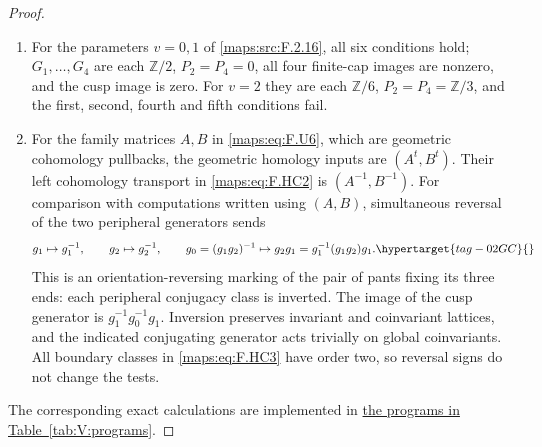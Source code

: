\documentclass[11pt,a4paper]{article}
\numberwithin{equation}{section}
\theoremstyle{definition}
\begin{document}
\begin{proof}
\begin{enumerate}[label=\arabic*.]
\item For the parameters $v=0,1$ of \ref{maps:src:F.2.16}, all six
conditions hold;
$G_1,\ldots,G_4$ are each $\mathbb Z/2$,
$P_2=P_4=0$, all four finite-cap images are nonzero,
and the cusp image is zero.
For $v=2$ they are each $\mathbb Z/6$,
$P_2=P_4=\mathbb Z/3$, and the first, second,
fourth and fifth conditions fail.

\item For the family matrices $A,B$ in \eqref{maps:eq:F.U6}, which
are geometric cohomology pullbacks, the geometric homology inputs
are $(A^t,B^t)$. Their left cohomology transport in
\eqref{maps:eq:F.HC2} is $(A^{-1},B^{-1})$.
For comparison with computations written using
$(A,B)$, simultaneous reversal of the two peripheral
generators sends
\begin{equation}
 g_1\mapsto g_1^{-1},\qquad
 g_2\mapsto g_2^{-1},\qquad
 g_0=(g_1g_2)^{-1}\mapsto
     g_2g_1=g_1^{-1}(g_1g_2)g_1 .
 \hypertarget{tag-02GC}{}\label{maps:eq:F.HC12}
\end{equation}
This is an orientation-reversing marking of the
pair of pants fixing its three ends: each peripheral
conjugacy class is inverted.
The image of the cusp generator is $g_1^{-1}g_0^{-1}g_1$.
Inversion preserves invariant and coinvariant
lattices, and the indicated conjugating generator
acts trivially on global coinvariants.
All boundary classes in \eqref{maps:eq:F.HC3} have order two, so
reversal signs do not change the tests.

\end{enumerate}
The corresponding exact calculations are implemented in \hyperlink{prog:V:cap-tests}{the programs in Table~\ref*{tab:V:programs}}.
\end{proof}
\end{document}
